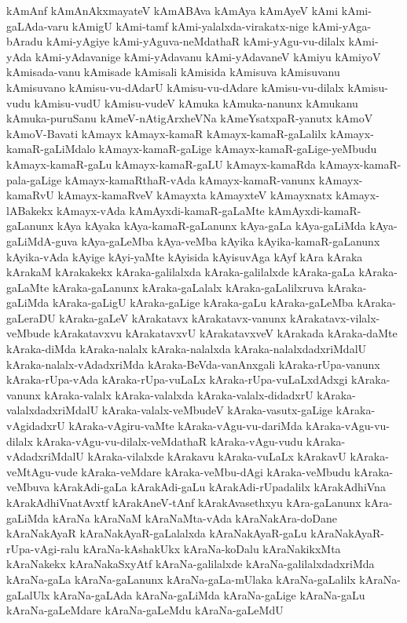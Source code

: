 {kAmAnf
kAmAnAkxmayateV
kAmABAva
kAmAya
kAmAyeV
kAmi
kAmi-gaLAda-varu
kAmigU
kAmi-tamf
kAmi-yalalxda-virakatx-nige
kAmi-yAga-bAradu
kAmi-yAgiye
kAmi-yAguva-neMdathaR
kAmi-yAgu-vu-dilalx
kAmi-yAda
kAmi-yAdavanige
kAmi-yAdavanu
kAmi-yAdavaneV
kAmiyu
kAmiyoV
kAmisada-vanu
kAmisade
kAmisali
kAmisida
kAmisuva
kAmisuvanu
kAmisuvano
kAmisu-vu-dAdarU
kAmisu-vu-dAdare
kAmisu-vu-dilalx
kAmisu-vudu
kAmisu-vudU
kAmisu-vudeV
kAmuka
kAmuka-nanunx
kAmukanu
kAmuka-puruSanu
kAmeV-nAtigArxheVNa
kAmeYsatxpaR-yanutx
kAmoV
kAmoV-Bavati
kAmayx
kAmayx-kamaR
kAmayx-kamaR-gaLalilx
kAmayx-kamaR-gaLiMdalo
kAmayx-kamaR-gaLige
kAmayx-kamaR-gaLige-yeMbudu
kAmayx-kamaR-gaLu
kAmayx-kamaR-gaLU
kAmayx-kamaRda
kAmayx-kamaR-pala-gaLige
kAmayx-kamaRthaR-vAda
kAmayx-kamaR-vanunx
kAmayx-kamaRvU
kAmayx-kamaRveV
kAmayxta
kAmayxteV
kAmayxnatx
kAmayx-lABakekx
kAmayx-vAda
kAmAyxdi-kamaR-gaLaMte
kAmAyxdi-kamaR-gaLanunx
kAya
kAyaka
kAya-kamaR-gaLanunx
kAya-gaLa
kAya-gaLiMda
kAya-gaLiMdA-guva
kAya-gaLeMba
kAya-veMba
kAyika
kAyika-kamaR-gaLanunx
kAyika-vAda
kAyige
kAyi-yaMte
kAyisida
kAyisuvAga
kAyf
kAra
kAraka
kArakaM
kArakakekx
kAraka-galilalxda
kAraka-galilalxde
kAraka-gaLa
kAraka-gaLaMte
kAraka-gaLanunx
kAraka-gaLalalx
kAraka-gaLalilxruva
kAraka-gaLiMda
kAraka-gaLigU
kAraka-gaLige
kAraka-gaLu
kAraka-gaLeMba
kAraka-gaLeraDU
kAraka-gaLeV
kArakatavx
kArakatavx-vanunx
kArakatavx-vilalx-veMbude
kArakatavxvu
kArakatavxvU
kArakatavxveV
kArakada
kAraka-daMte
kAraka-diMda
kAraka-nalalx
kAraka-nalalxda
kAraka-nalalxdadxriMdalU
kAraka-nalalx-vAdadxriMda
kAraka-BeVda-vanAnxgali
kAraka-rUpa-vanunx
kAraka-rUpa-vAda
kAraka-rUpa-vuLaLx
kAraka-rUpa-vuLaLxdAdxgi
kAraka-vanunx
kAraka-valalx
kAraka-valalxda
kAraka-valalx-didadxrU
kAraka-valalxdadxriMdalU
kAraka-valalx-veMbudeV
kAraka-vasutx-gaLige
kAraka-vAgidadxrU
kAraka-vAgiru-vaMte
kAraka-vAgu-vu-dariMda
kAraka-vAgu-vu-dilalx
kAraka-vAgu-vu-dilalx-veMdathaR
kAraka-vAgu-vudu
kAraka-vAdadxriMdalU
kAraka-vilalxde
kArakavu
kAraka-vuLaLx
kArakavU
kAraka-veMtAgu-vude
kAraka-veMdare
kAraka-veMbu-dAgi
kAraka-veMbudu
kAraka-veMbuva
kArakAdi-gaLa
kArakAdi-gaLu
kArakAdi-rUpadalilx
kArakAdhiVna
kArakAdhiVnatAvxtf
kArakAneV-tAnf
kArakAvasethxyu
kAra-gaLanunx
kAra-gaLiMda
kAraNa
kAraNaM
kAraNaMta-vAda
kAraNakAra-doDane
kAraNakAyaR
kAraNakAyaR-gaLalalxda
kAraNakAyaR-gaLu
kAraNakAyaR-rUpa-vAgi-ralu
kAraNa-kAshakUkx
kAraNa-koDalu
kAraNakikxMta
kAraNakekx
kAraNakaSxyAtf
kAraNa-galilalxde
kAraNa-galilalxdadxriMda
kAraNa-gaLa
kAraNa-gaLanunx
kAraNa-gaLa-mUlaka
kAraNa-gaLalilx
kAraNa-gaLalUlx
kAraNa-gaLAda
kAraNa-gaLiMda
kAraNa-gaLige
kAraNa-gaLu
kAraNa-gaLeMdare
kAraNa-gaLeMdu
kAraNa-gaLeMdU
}
